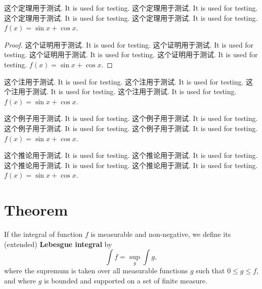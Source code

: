 \begin{theorem}[option]\label{thm:test}
  这个定理用于测试. It is used for testing. 这个定理用于测试. It is used for testing. 这个定理用于测试. It is used for testing. 这个定理用于测试. It is used for testing. $f(x)=\sin x + \cos x$.
\end{theorem}

\begin{proof}
  这个证明用于测试. It is used for testing. 这个证明用于测试. It is used for testing. 这个证明用于测试. It is used for testing. 这个证明用于测试. It is used for testing. $f(x)=\sin x + \cos x$.
\end{proof}

\begin{remark}\label{rem:test}
  这个注用于测试. It is used for testing. 这个注用于测试. It is used for testing. 这个注用于测试. It is used for testing. 这个注用于测试. It is used for testing. $f(x)=\sin x + \cos x$.
\end{remark}

\begin{example}\label{ex:test}
  这个例子用于测试. It is used for testing. 这个例子用于测试. It is used for testing. 这个例子用于测试. It is used for testing. 这个例子用于测试. It is used for testing. $f(x)=\sin x + \cos x$.
\end{example}

\begin{corollary}\label{cor:test}
  这个推论用于测试. It is used for testing. 这个推论用于测试. It is used for testing. 这个推论用于测试. It is used for testing. 这个推论用于测试. It is used for testing. $f(x)=\sin x + \cos x$.
\end{corollary}

\section{Theorem}

\begin{definition}
  If the integral of function $f$ is measurable and non-negative, we define
  its (extended) \textbf{Lebesgue integral} by
  \begin{equation}\label{eq:test}
    \int f = \sup_g \int g,
  \end{equation}
  where the supremum is taken over all measurable functions $g$ such that
  $0 \leq g \leq f$, and where $g$ is bounded and supported on a set of
  finite measure.
\end{definition}

